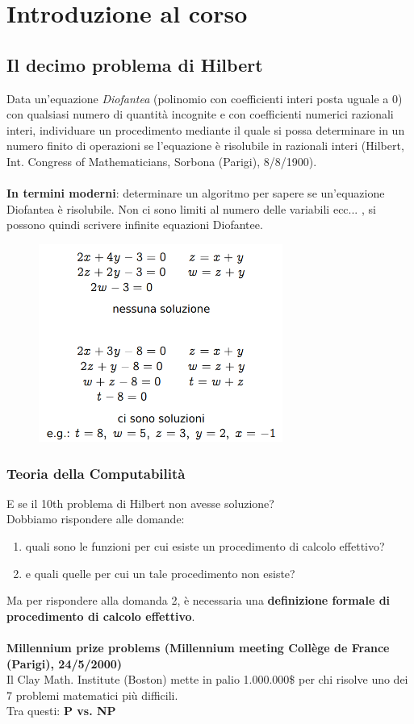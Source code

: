 \chapter{Introduzione al corso}
\section{Il decimo problema di Hilbert}
Data un’equazione \textit{Diofantea} (polinomio con coefficienti interi posta uguale a 0) con qualsiasi numero di quantità incognite e con coefficienti numerici razionali interi, individuare un procedimento mediante il quale si possa determinare in un numero finito di operazioni se l’equazione è risolubile in razionali interi (Hilbert, Int. Congress of Mathematicians, Sorbona (Parigi), 8/8/1900).\\\\
\textbf{In termini moderni}: determinare un algoritmo per sapere se un’equazione Diofantea è risolubile. Non ci sono limiti al numero delle variabili ecc... , si possono quindi scrivere infinite equazioni Diofantee. 
\begin{figure}[H]
	\centering
    \includegraphics[width=8cm, keepaspectratio]{tesi_stile/img/dio1.png}
\end{figure}

\subsection{Teoria della Computabilità}
E se il 10th problema di Hilbert non avesse soluzione?\\
Dobbiamo rispondere alle domande:
\begin{enumerate}
    \item quali sono le funzioni per cui esiste un procedimento di calcolo effettivo?
    \item e quali quelle per cui un tale procedimento non esiste?
\end{enumerate}
Ma per rispondere alla domanda 2, è necessaria una \textbf{definizione formale di procedimento di calcolo effettivo}.\\\\
\textbf{Millennium prize problems (Millennium meeting Collège de France (Parigi), 24/5/2000)}\\
Il Clay Math. Institute (Boston) mette in palio 1.000.000\$ per chi risolve uno dei 7 problemi matematici più difficili.\\
Tra questi: \textbf{P vs. NP}
